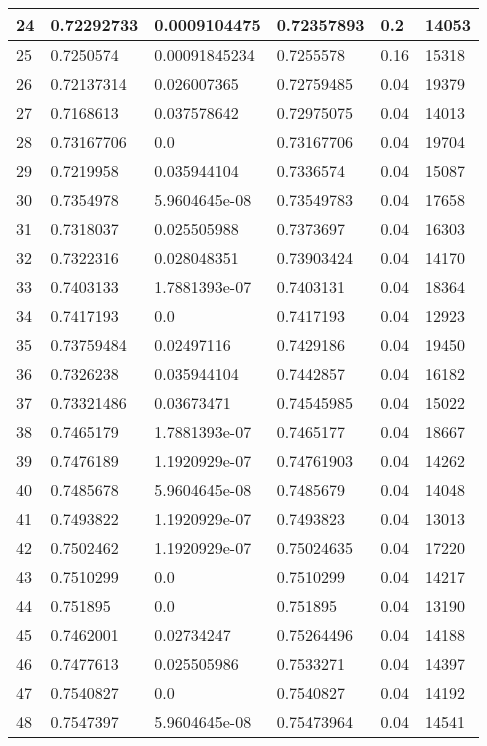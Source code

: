 \begin{longtable}{|l|l|l|l|l|l|}
24 & 0.72292733 & 0.0009104475 & 0.72357893 & 0.2 & 14053 \\ \hline 
25 & 0.7250574 & 0.00091845234 & 0.7255578 & 0.16 & 15318 \\ \hline 
26 & 0.72137314 & 0.026007365 & 0.72759485 & 0.04 & 19379 \\ \hline 
27 & 0.7168613 & 0.037578642 & 0.72975075 & 0.04 & 14013 \\ \hline 
28 & 0.73167706 & 0.0 & 0.73167706 & 0.04 & 19704 \\ \hline 
29 & 0.7219958 & 0.035944104 & 0.7336574 & 0.04 & 15087 \\ \hline 
30 & 0.7354978 & 5.9604645e-08 & 0.73549783 & 0.04 & 17658 \\ \hline 
31 & 0.7318037 & 0.025505988 & 0.7373697 & 0.04 & 16303 \\ \hline 
32 & 0.7322316 & 0.028048351 & 0.73903424 & 0.04 & 14170 \\ \hline 
33 & 0.7403133 & 1.7881393e-07 & 0.7403131 & 0.04 & 18364 \\ \hline 
34 & 0.7417193 & 0.0 & 0.7417193 & 0.04 & 12923 \\ \hline 
35 & 0.73759484 & 0.02497116 & 0.7429186 & 0.04 & 19450 \\ \hline 
36 & 0.7326238 & 0.035944104 & 0.7442857 & 0.04 & 16182 \\ \hline 
37 & 0.73321486 & 0.03673471 & 0.74545985 & 0.04 & 15022 \\ \hline 
38 & 0.7465179 & 1.7881393e-07 & 0.7465177 & 0.04 & 18667 \\ \hline 
39 & 0.7476189 & 1.1920929e-07 & 0.74761903 & 0.04 & 14262 \\ \hline 
40 & 0.7485678 & 5.9604645e-08 & 0.7485679 & 0.04 & 14048 \\ \hline 
41 & 0.7493822 & 1.1920929e-07 & 0.7493823 & 0.04 & 13013 \\ \hline 
42 & 0.7502462 & 1.1920929e-07 & 0.75024635 & 0.04 & 17220 \\ \hline 
43 & 0.7510299 & 0.0 & 0.7510299 & 0.04 & 14217 \\ \hline 
44 & 0.751895 & 0.0 & 0.751895 & 0.04 & 13190 \\ \hline 
45 & 0.7462001 & 0.02734247 & 0.75264496 & 0.04 & 14188 \\ \hline 
46 & 0.7477613 & 0.025505986 & 0.7533271 & 0.04 & 14397 \\ \hline 
47 & 0.7540827 & 0.0 & 0.7540827 & 0.04 & 14192 \\ \hline 
48 & 0.7547397 & 5.9604645e-08 & 0.75473964 & 0.04 & 14541 \\ \hline 

\end{longtable}
